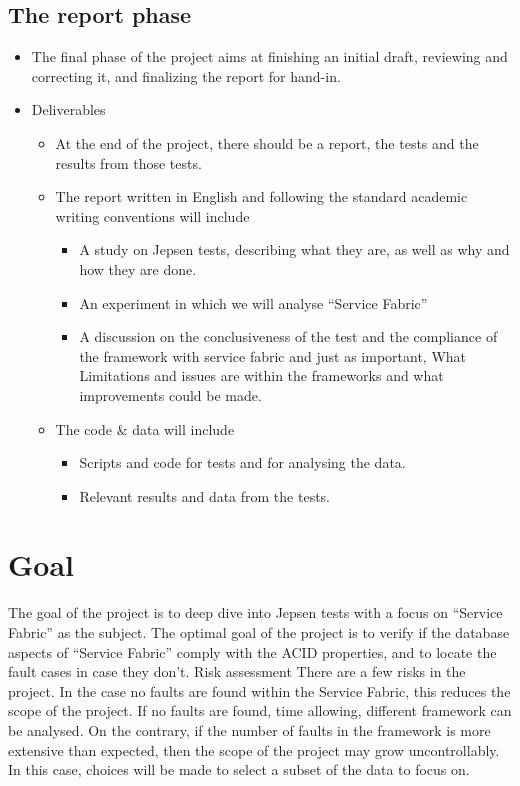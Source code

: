 \subsection{The report phase }
\begin{itemize}
\item The final phase of the project aims at finishing an initial draft, reviewing and correcting it, and finalizing the report for hand-in.
\item	Deliverables 
\begin{itemize}
\item	At the end of the project, there should be a report, the tests and the results from those tests. 
\item	The report written in English and following the standard academic writing conventions will include 
\begin{itemize}
\item	A study on Jepsen tests, describing what they are, as well as why and how they are done.
\item	An experiment in which we will analyse “Service Fabric”	
\item	A discussion on the conclusiveness of the test and the compliance of the framework with service fabric and just as important, What Limitations and issues are within the frameworks and what improvements could be made.
\end{itemize}
\item	The code \& data will include
\begin{itemize}
\item	Scripts and code for tests and for analysing the data.
\item	Relevant results and data from the tests. 
\end{itemize}
\end{itemize}
\end{itemize}

\section{Goal}
The goal of the project is to deep dive into Jepsen tests with a focus on “Service Fabric” as the subject. The optimal goal of the project is to verify if the database aspects of “Service Fabric” comply with the ACID properties, and to locate the fault cases in case they don’t.    
Risk assessment 
There are a few risks in the project. In the case no faults are found within the Service Fabric, this reduces the scope of the project. If no faults are found, time allowing, different framework can be analysed. On the contrary, if the number of faults in the framework is more extensive than expected, then the scope of the project may grow uncontrollably. In this case, choices will be made to select a subset of the data to focus on.



